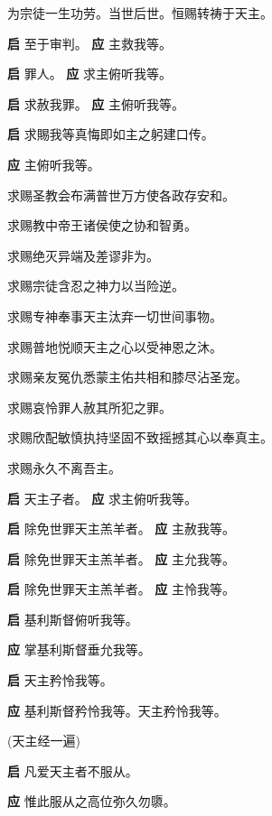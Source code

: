 \documentclass[UTF8,17pt]{ctexart}
\begin{document}
 为宗徒⼀⽣功劳。当世后世。恒赐转祷于天主。

\textbf{启} \quad ⾄于审判。 \hfill \textbf{应} \quad 主救我等。\phantom{CC}

\textbf{启} \quad 罪⼈。 \hfill \textbf{应} \quad 求主俯听我等。

\textbf{启} \quad 求赦我罪。 \hfill \textbf{应} \quad 主俯听我等。\phantom{c}

\textbf{启} \quad 求賜我等真悔即如主之躬建口传。

\textbf{应} \quad 主俯听我等。

 求赐圣教会布满普世万⽅使各政存安和。

 求赐教中帝王诸侯使之协和智勇。

 求赐绝灭异端及差谬⾮为。

 求赐宗徒含忍之神⼒以当险逆。

 求赐专神奉事天主汰弃⼀切世间事物。

 求赐普地悦顺天主之⼼以受神恩之沐。

 求赐亲友冤仇悉蒙主佑共相和膝尽沾圣宠。

 求赐哀怜罪⼈赦其所犯之罪。

 求赐欣配敏慎执持坚固不致摇撼其⼼以奉真主。

 求赐永久不离吾主。

\textbf{启} \quad 天主⼦者。 \hfill \textbf{应} \quad 求主俯听我等。

\textbf{启} \quad 除免世罪天主羔⽺者。 \hfill \textbf{应} \quad 主赦我等。

\textbf{启} \quad 除免世罪天主羔⽺者。 \hfill \textbf{应} \quad 主允我等。

\textbf{启} \quad 除免世罪天主羔⽺者。 \hfill \textbf{应} \quad 主怜我等。

\textbf{启} \quad 基利斯督俯听我等。

\textbf{应} \quad 掌基利斯督垂允我等。

\textbf{启} \quad 天主矜怜我等。

\textbf{应} \quad 基利斯督矜怜我等。天主矜怜我等。

(天主经一遍)

\textbf{启} \quad 凡爱天主者不服从。

\textbf{应} \quad 惟此服从之⾼位弥久勿隳。
\end{document}
